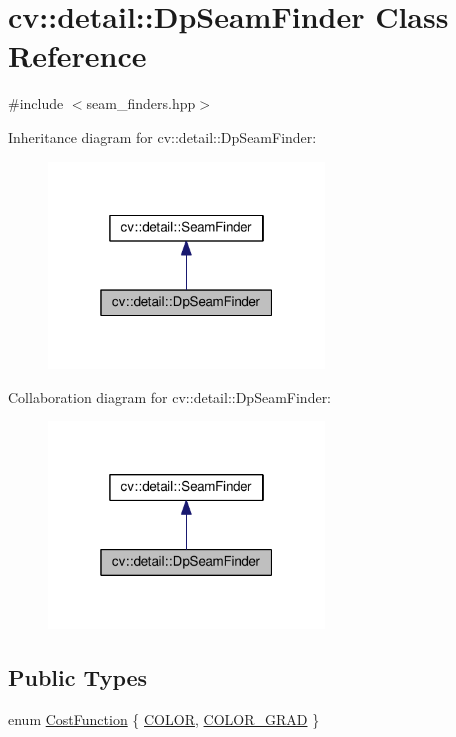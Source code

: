\hypertarget{classcv_1_1detail_1_1DpSeamFinder}{\section{cv\-:\-:detail\-:\-:Dp\-Seam\-Finder Class Reference}
\label{classcv_1_1detail_1_1DpSeamFinder}
}


{\ttfamily \#include $<$seam\-\_\-finders.\-hpp$>$}



Inheritance diagram for cv\-:\-:detail\-:\-:Dp\-Seam\-Finder\-:\nopagebreak
\begin{figure}[H]
\begin{center}
\leavevmode
\includegraphics[width=208pt]{classcv_1_1detail_1_1DpSeamFinder__inherit__graph}
\end{center}
\end{figure}


Collaboration diagram for cv\-:\-:detail\-:\-:Dp\-Seam\-Finder\-:\nopagebreak
\begin{figure}[H]
\begin{center}
\leavevmode
\includegraphics[width=208pt]{classcv_1_1detail_1_1DpSeamFinder__coll__graph}
\end{center}
\end{figure}
\subsection*{Public Types}
\begin{DoxyCompactItemize}
\item 
enum \hyperlink{classcv_1_1detail_1_1DpSeamFinder_a6ce104a17b48a0503ccdcf4787ba2ef3}{Cost\-Function} \{ \hyperlink{classcv_1_1detail_1_1DpSeamFinder_a6ce104a17b48a0503ccdcf4787ba2ef3aa9485acd73bb7982e3b2d853d6b12947}{C\-O\-L\-O\-R}, 
\hyperlink{classcv_1_1detail_1_1DpSeamFinder_a6ce104a17b48a0503ccdcf4787ba2ef3a306cd9d1479580c01f8d2ffa5328917b}{C\-O\-L\-O\-R\-\_\-\-G\-R\-A\-D}
 \}
\end{DoxyCompactItemize}
